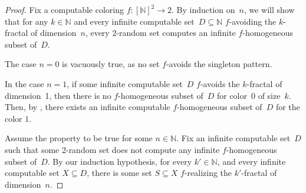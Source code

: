 \documentclass{article}
\numberwithin{theorem}{section}
\newcommand{\ludovic}[1]{\textcolor{blue}{#1}}
\newcommand{\quentin}[1]{\textcolor{green}{#1}}
\newcommand{\NN}[0]{\mathbb{N}}
\begin{document}
\begin{proof}
Fix a computable coloring $f : [\NN]^2 \to 2$. By induction on~$n$, we will show that for any $k \in \NN$ and every infinite computable set~$D \subseteq \NN$ $f$-avoiding the $k$-fractal of dimension~$n$, every $2$-random set computes an infinite $f$-homogeneous subset of~$D$.

The case $n = 0$ is vacuously true, as no set $f$-avoids the singleton pattern.

In the case $n = 1$, if some infinite computable set~$D$ $f$-avoids the $k$-fractal of dimension~1, then there is no $f$-homogeneous subset of~$D$ for color~0 of size~$k$. Then, by , there exists an infinite computable $f$-homogeneous subset of~$D$ for the color $1$.


Assume the property to be true for some $n \in \NN$. Fix an infinite computable set~$D$ such that some 2-random set does not compute any infinite $f$-homogeneous subset of~$D$. %
By our induction hypothesis, for every $k' \in \NN$, and every infinite computable set $X \subseteq D$, there is some set $S \subseteq X$ $f$-realizing the $k'$-fractal of dimension~$n$.


\end{proof}
\end{document}
